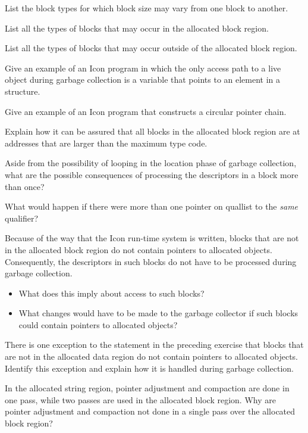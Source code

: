  List the block types for which block size may
vary from one block to another.

 List all the types of blocks that may occur in
the allocated block region.

 List all the types of blocks that may occur
outside of the allocated block region.

 Give an example of an Icon program in which the
only access path to a live object during garbage collection is a
variable that points to an element in a structure.

 Give an example of an Icon program that
constructs a circular pointer chain.

 Explain how it can be assured that all blocks in
the allocated block region are at addresses that are larger than the
maximum type code.

 Aside from the possibility of looping in the
location phase of garbage collection, what are the possible
consequences of processing the descriptors in a block more than once?

 What would happen if there were more than one
pointer on quallist to the \textit{same} qualifier?

 Because of the way that the Icon run-time system
is written, blocks that are not in the allocated block region do not
contain pointers to allocated objects. Consequently, the descriptors
in such blocks do not have to be processed during garbage collection.

\begin{itemize}
\item What does this imply about access to such blocks?

\item What changes would have to be made to the garbage collector if
such blocks could contain pointers to allocated objects?

\end{itemize}

 There is one exception to the statement in the
preceding exercise that blocks that are not in the allocated data
region do not contain pointers to allocated objects. Identify this
exception and explain how it is handled during garbage collection.

 In the allocated string region, pointer
adjustment and compaction are done in one pass, while two passes are
used in the allocated block region. Why are pointer adjustment and
compaction not done in a single pass over the allocated block region?

